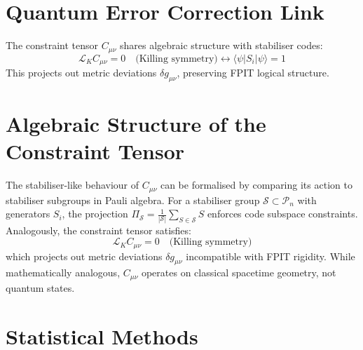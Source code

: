 \documentclass[twocolumn]{article}
\begin{document}
	\FloatBarrier%
	\section{Quantum Error Correction Link}\label{app:qecc}
	
	The constraint tensor \(C_{\mu\nu}\) shares algebraic structure with stabiliser codes\cite{almheiri2020}:  
	\begin{equation}
		\mathcal{L}_K C_{\mu\nu} = 0 \quad \text{(Killing symmetry)} \longleftrightarrow \langle \psi | S_i | \psi \rangle = 1
	\end{equation}
	This projects out metric deviations \(\delta g_{\mu\nu}\), preserving FPIT logical structure.  
	
	\FloatBarrier%
	\section{Algebraic Structure of the Constraint Tensor}\label{app:algebra}
	The stabiliser-like behaviour of $C_{\mu\nu}$ can be formalised by comparing its action to stabiliser subgroups in Pauli algebra. For a stabiliser group $\mathcal{S} \subset \mathcal{P}_n$ with generators $S_i$, the projection $\Pi_{\mathcal{S}} = \frac{1}{|\mathcal{S}|}\sum_{S \in \mathcal{S}} S$ enforces code subspace constraints. Analogously, the constraint tensor satisfies:  
	\begin{equation}
		\mathcal{L}_K C_{\mu\nu} = 0 \quad \text{(Killing symmetry)}
	\end{equation}
	which projects out metric deviations $\delta g_{\mu\nu}$ incompatible with FPIT rigidity. While mathematically analogous, $C_{\mu\nu}$ operates on classical spacetime geometry, not quantum states.
	
	\FloatBarrier%
	\section{Statistical Methods}\label{app:stats}
	
\end{document}
